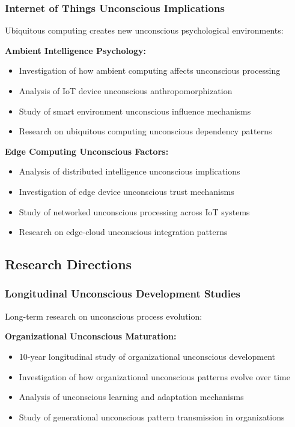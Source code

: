 \documentclass[11pt,a4paper]{article}
\begin{document}
\subsubsection{Internet of Things Unconscious Implications}

Ubiquitous computing creates new unconscious psychological environments:

\textbf{Ambient Intelligence Psychology:}
\begin{itemize}
\item Investigation of how ambient computing affects unconscious processing
\item Analysis of IoT device unconscious anthropomorphization
\item Study of smart environment unconscious influence mechanisms
\item Research on ubiquitous computing unconscious dependency patterns
\end{itemize}

\textbf{Edge Computing Unconscious Factors:}
\begin{itemize}
\item Analysis of distributed intelligence unconscious implications
\item Investigation of edge device unconscious trust mechanisms
\item Study of networked unconscious processing across IoT systems
\item Research on edge-cloud unconscious integration patterns
\end{itemize}

\subsection{Research Directions}

\subsubsection{Longitudinal Unconscious Development Studies}

Long-term research on unconscious process evolution:

\textbf{Organizational Unconscious Maturation:}
\begin{itemize}
\item 10-year longitudinal study of organizational unconscious development
\item Investigation of how organizational unconscious patterns evolve over time
\item Analysis of unconscious learning and adaptation mechanisms
\item Study of generational unconscious pattern transmission in organizations
\end{itemize}
\end{document}
